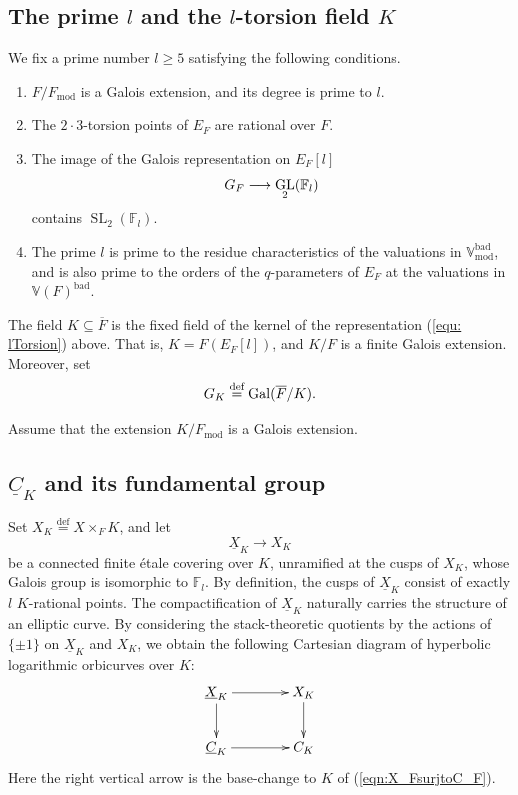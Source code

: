 \documentclass[12pt, reqno, a4paper]{amsart}
\def\udl#1{\underline{#1}} %
\def\ovl#1{\overline{#1}} %
\def\longto{\longrightarrow}
\def\eqdef{\stackrel{\textrm{def}}{=}} %
\def\bF{\mathbb{F}} %
\def\bV{\mathbb{V}}
\def\uX{\udl{X}} %
\def\uC{\udl{C}} %
\def\bad{\mathrm{bad}}
\DeclareMathOperator{\GL}{GL}
\DeclareMathOperator{\SL}{SL}
\DeclareMathOperator{\Gal}{Gal}
\DeclareMathOperator{\tmod}{mod}
\begin{document}
\subsection{The prime \(l\) and the \(l\)-torsion field \(K\)}
We fix a prime number \(l\geq 5\) satisfying the following conditions.
\begin{enumerate}
\item[(a)] \(F/F_{\tmod}\) is a Galois extension, and its degree is prime to \(l\).
\item[(b)] The \(2\cdot3\)-torsion points of \(E_F\) are rational over \(F\).
\item[(c)] The image of the Galois representation on \(E_F[l]\)
\begin{equation}\label{equ: lTorsion}
  \GG_F\longto \GL_2(\bF_l)
\end{equation}
contains \(\SL_2(\bF_l)\).
\item[(d)] The prime \(l\) is prime to the residue characteristics of the valuations in \(\bV^{\bad}_{\tmod}\), and is also prime to the orders of the \(q\)-parameters of \(E_F\) at the valuations in \(\bV(F)^{\bad}\).
\end{enumerate}


\begin{dfn}\label{dfn:fieldK}
The field \(K\subseteq\ovl{F}\) is the fixed field of the kernel of the representation (\ref{equ: lTorsion}) above.
That is, $K=F(E_F[l])$, and \(K/F\) is a finite Galois extension.
Moreover, set
\begin{equation*}
  \GG_K\eqdef\Gal(\ovl{F}/K).
\end{equation*}
\end{dfn}

\begin{assum}\label{assum:GaloisnessAssumption}
Assume that the extension $K/F_{\tmod}$ is a Galois extension.
\end{assum}


\subsection{\(\uC_K\) and its fundamental group}
Set $X_K\eqdef X\times_F K$, and let
\[
\uX_K\longto X_K
\]
be a connected finite {\'e}tale covering over $K$, unramified at the cusps of $X_K$, whose Galois group is isomorphic to $\bF_l$.
By definition, the cusps of $\uX_K$ consist of exactly $l$ $K$-rational points.
The compactification of $\uX_K$ naturally carries the structure of an elliptic curve.
By considering the stack-theoretic quotients by the actions of $\{\pm1\}$ on $\uX_K$ and $X_K$, we obtain the following Cartesian diagram of hyperbolic logarithmic orbicurves over $K$:
\begin{equation}\label{eqn:uC_KtoC_K}
\xymatrix@C=4em{
\uX_K\ar[r]\ar[d]&X_K\ar[d]\\
\uC_K\ar[r]&C_K
}
\end{equation}
Here the right vertical arrow is the base-change to $K$ of (\ref{eqn:X_FsurjtoC_F}).
\end{document}
